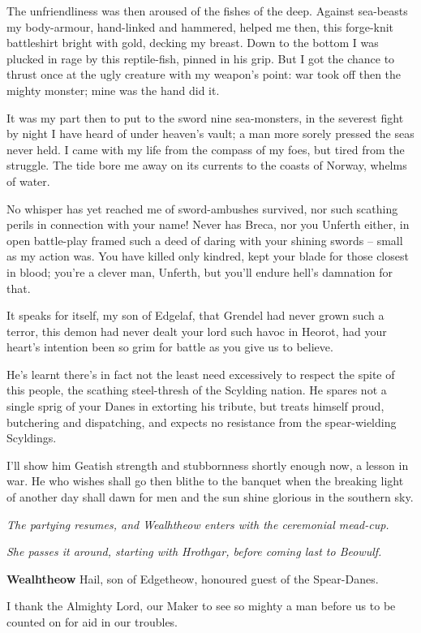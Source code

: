 \documentclass[a4paper]{article}
\begin{document}
{The unfriendliness was then aroused of the fishes of the deep.
Against sea-beasts my body-armour,
hand-linked and hammered, helped me then,
this forge-knit battleshirt bright with gold,
decking my breast. Down to the bottom
I was plucked in rage by this reptile-fish,
pinned in his grip. But I got the chance
to thrust once at the ugly creature
with my weapon's point: war took off then
the mighty monster; mine was the hand did it.

\newpage
It was my part then to put to the sword
nine sea-monsters, in the severest fight
by night I have heard of under heaven's vault;
a man more sorely pressed the seas never held.
I came with my life from the compass of my foes,
but tired from the struggle. The tide bore me
away on its currents to the coasts of Norway,
whelms of water.

No whisper has yet reached me
of sword-ambushes survived, nor such scathing perils
in connection with your name! Never has Breca,
nor you Unferth either, in open battle-play
framed such a deed of daring with your
shining swords – small as my action was.
You have killed only kindred, kept your blade
for those closest in blood; you're a clever man, Unferth,
but you'll endure hell's damnation for that.

It speaks for itself, my son of Edgelaf,
that Grendel had never grown such a terror,
this demon had never dealt your lord
such havoc in Heorot, had your heart's intention
been so grim for battle as you give us to believe.

He's learnt there's in fact not the least need
excessively to respect the spite of this people,
the scathing steel-thresh of the Scylding nation.
He spares not a single sprig of your Danes
in extorting his tribute, but treats himself proud,
butchering and dispatching, and expects no resistance
from the spear-wielding Scyldings.

I'll show him Geatish
strength and stubbornness shortly enough now,
a lesson in war. He who wishes shall go then
blithe to the banquet when the breaking light
of another day shall dawn for men
and the sun shine glorious in the southern sky.

\newpage
\centerline{\textit{The partying resumes, and Wealhtheow enters with the ceremonial mead-cup.}}
\centerline{\textit{She passes it around, starting with Hrothgar, before coming last to Beowulf.}}

\textbf{Wealhtheow} Hail, son of Edgetheow,
honoured guest of the Spear-Danes.

I thank the Almighty Lord, our Maker
to see so mighty a man before us
to be counted on for aid in our troubles.

}
\end{document}

